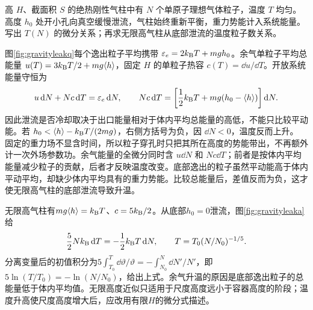 \begin{example}[重力气柱从低处泄流可以升温]
高 $H$、截面积 $S$ 的绝热刚性气柱中有 $N$ 个单原子理想气体粒子，温度 $T$ 均匀。高度 $h_0$ 处开小孔向真空缓慢泄流，气柱始终重新平衡，重力势能计入系统能量。写出 $T(N)$ 的微分关系；再求无限高气柱从底部泄流的温度粒子数关系。
\end{example}
\begin{solution}
图\ref{fig:gravityleakq}每个逸出粒子平均携带 $\varepsilon_e=2k_{\mathrm B} T+mgh_0$。余气单粒子平均总能量 $u(T)=3k_{\mathrm B} T/2+mg\langle h\rangle$，固定 $H$ 的单粒子热容 $c(T)=\dd u/\dd T$。开放系统能量守恒为
\[
 u\mathop{}\!\mathrm d N+Nc\mathop{}\!\mathrm d T=\varepsilon_e\mathop{}\!\mathrm d N,
 \qquad Nc\mathop{}\!\mathrm d T=
 \left[\frac12k_{\mathrm B} T+mg(h_0-\langle h\rangle)\right]\mathop{}\!\mathrm d N.
\]
因此泄流是否冷却取决于出口能量相对于体内平均总能量的高低，不能只比较平动能。若 $h_0<\langle h\rangle-k_{\mathrm B} T/(2mg)$，右侧方括号为负，因 $\dd N<0$，温度反而上升。
固定的重力场不显含时间，所以粒子穿孔时只把其所在高度的势能带出，不再额外计一次外场参数功。余气能量的全微分同时含 $u\dd N$ 和 $Nc\dd T$；前者是按体内平均能量减少粒子的贡献，后者才反映温度改变。底部逸出的粒子虽然平动能高于体内平动平均，却缺少体内平均具有的重力势能。比较总能量后，差值反而为负，这才使无限高气柱的底部泄流导致升温。

无限高气柱有$mg\langle h\rangle=k_{\mathrm B} T$、$c=5k_{\mathrm B}/2$。从底部$h_0=0$泄流，图\ref{fig:gravityleaka}给
\[
 \frac52Nk_{\mathrm B}\mathop{}\!\mathrm d T=-\frac12k_{\mathrm B} T\mathop{}\!\mathrm d N,
 \qquad T=T_0(N/N_0)^{-1/5}.
\]
分离变量后的初值积分为$5\int_{T_0}^{T}\dd\vartheta/\vartheta=-\int_{N_0}^{N}\dd N'/N'$，即$5\ln(T/T_0)=-\ln(N/N_0)$，给出上式。余气升温的原因是底部逸出粒子的总能量低于体内平均值。无限高度近似只适用于尺度高度远小于容器高度的阶段；温度升高使尺度高度增大后，应改用有限$H$的微分式描述。
\end{solution}


